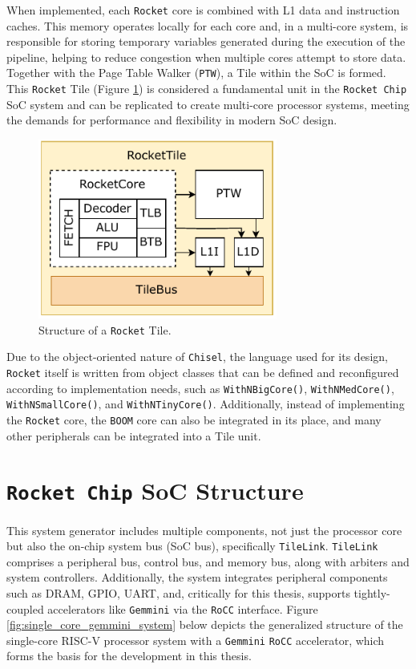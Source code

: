 When implemented, each \texttt{Rocket} core is combined with L1 data and instruction caches. This memory operates locally for each core and, in a multi-core system, is responsible for storing temporary variables generated during the execution of the pipeline, helping to reduce congestion when multiple cores attempt to store data. Together with the Page Table Walker (\texttt{PTW}), a Tile within the SoC is formed. This \texttt{Rocket} Tile (Figure \ref{fig:rocket_tile_structure}) is considered a fundamental unit in the \texttt{Rocket Chip} SoC system and can be replicated to create multi-core processor systems, meeting the demands for performance and flexibility in modern SoC design.

\begin{figure}[h!]
    \centering
    \includegraphics[width=0.7\textwidth]{Images/RocketTile_Basic.pdf}
    \caption{Structure of a \texttt{Rocket} Tile.}
    \label{fig:rocket_tile_structure}
\end{figure}

Due to the object-oriented nature of \texttt{Chisel}, the language used for its design, \texttt{Rocket} itself is written from object classes that can be defined and reconfigured according to implementation needs, such as \texttt{WithNBigCore()}, \texttt{WithNMedCore()}, \texttt{WithNSmallCore()}, and \texttt{WithNTinyCore()}. Additionally, instead of implementing the \texttt{Rocket} core, the \texttt{BOOM} core can also be integrated in its place, and many other peripherals can be integrated into a Tile unit.

\section{\texttt{Rocket Chip} SoC Structure}
\label{sec:rocketchip_soc_structure}

This system generator includes multiple components, not just the processor core but also the on-chip system bus (SoC bus), specifically \texttt{TileLink}. \texttt{TileLink} comprises a peripheral bus, control bus, and memory bus, along with arbiters and system controllers. Additionally, the system integrates peripheral components such as DRAM, GPIO, UART, and, critically for this thesis, supports tightly-coupled accelerators like \texttt{Gemmini} via the \texttt{RoCC} interface. Figure \ref{fig:single_core_gemmini_system} below depicts the generalized structure of the single-core RISC-V processor system with a \texttt{Gemmini} \texttt{RoCC} accelerator, which forms the basis for the development in this thesis.

